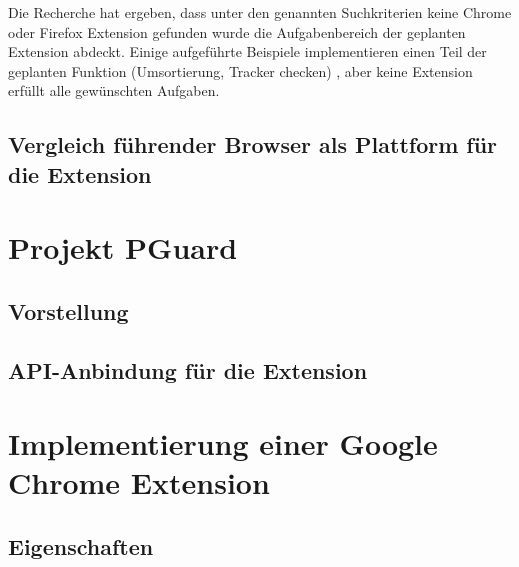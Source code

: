 Die Recherche hat ergeben, dass unter den genannten Suchkriterien keine Chrome oder Firefox Extension gefunden wurde die Aufgabenbereich der geplanten Extension abdeckt. Einige aufgeführte Beispiele implementieren einen Teil der geplanten Funktion (Umsortierung, Tracker checken) , aber keine Extension erfüllt alle gewünschten Aufgaben.


\subsection{Vergleich führender Browser als Plattform für die Extension}
\label{ss:vergleichbrowser}


\section{Projekt PGuard}
\label{s:pguard}

\subsection{Vorstellung}
\label{ss:vorstellung}

\subsection{API-Anbindung für die Extension}
\label{ss:apianbindung}


\section{Implementierung einer Google Chrome Extension}
\label{s:implementierung}

\subsection{Eigenschaften}
\label{ss:eigenschaften}


